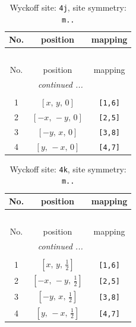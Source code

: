 \documentclass[fleqn,8pt]{jsarticle}
\begin{document}
\begin{longtable}{ccc}
\caption{Wyckoff site: {\tt 4j}, site symmetry: {\tt m..}}
 \\
 \hline \hline
No. & position & mapping \\ \hline \endfirsthead

\multicolumn{2}{l}{\tablename\ \thetable{}} \\
 \hline \hline
No. & position & mapping \\ \hline \endhead

 \hline \hline
\multicolumn{2}{r}{\footnotesize\it continued ...} \\ \endfoot

 \hline \hline
\multicolumn{2}{r}{} \\ \endlastfoot

1 & $\left[ x,\, y,\, 0 \right]$ & {\tt [1,6]} \\ \hline
2 & $\left[ - x,\, - y,\, 0 \right]$ & {\tt [2,5]} \\ \hline
3 & $\left[ - y,\, x,\, 0 \right]$ & {\tt [3,8]} \\ \hline
4 & $\left[ y,\, - x,\, 0 \right]$ & {\tt [4,7]} \\
\end{longtable}
\renewcommand{\arraystretch}{1.2}
\begin{longtable}{ccc}
\caption{Wyckoff site: {\tt 4k}, site symmetry: {\tt m..}}
 \\
 \hline \hline
No. & position & mapping \\ \hline \endfirsthead

\multicolumn{2}{l}{\tablename\ \thetable{}} \\
 \hline \hline
No. & position & mapping \\ \hline \endhead

 \hline \hline
\multicolumn{2}{r}{\footnotesize\it continued ...} \\ \endfoot

 \hline \hline
\multicolumn{2}{r}{} \\ \endlastfoot

1 & $\left[ x,\, y,\, \frac{1}{2} \right]$ & {\tt [1,6]} \\ \hline
2 & $\left[ - x,\, - y,\, \frac{1}{2} \right]$ & {\tt [2,5]} \\ \hline
3 & $\left[ - y,\, x,\, \frac{1}{2} \right]$ & {\tt [3,8]} \\ \hline
4 & $\left[ y,\, - x,\, \frac{1}{2} \right]$ & {\tt [4,7]} \\
\end{longtable}
\end{document}
